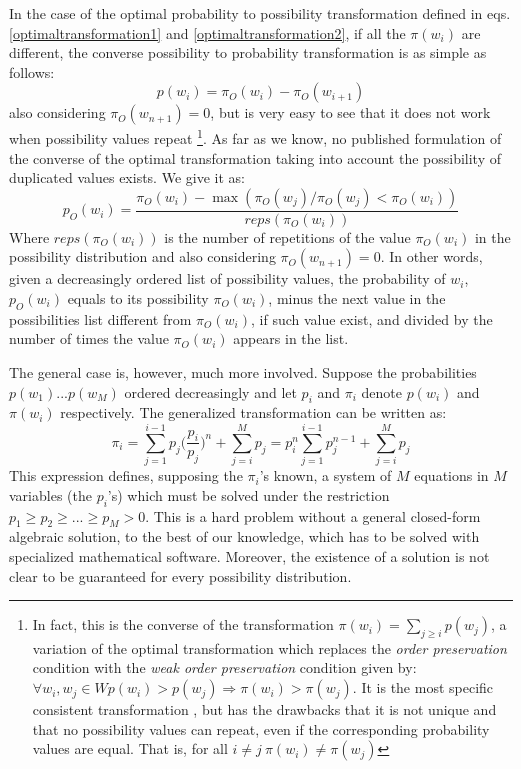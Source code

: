 \documentclass[a4paper]{article}
\begin{document}
In the case of the optimal probability to possibility transformation defined in eqs. \ref{optimaltransformation1} and \ref{optimaltransformation2}, if all the $\pi(w_i)$ are different, the converse possibility to probability transformation is as simple as follows:
\begin{equation}
p(w_i)=\pi_O(w_i)-\pi_O(w_{i+1})
\end{equation}
also considering $\pi_O(w_{n+1})=0$, but is very easy to see that it does not work when possibility values repeat \footnote{In fact, this is the converse of the transformation $\pi(w_i)=\sum_{j \geq i}p(w_j)$, a variation of the optimal transformation which replaces the \textit{order preservation} condition with the \textit{weak order preservation} condition given by: $\forall w_i,w_j \in W  p(w_i) > p(w_j) \Rightarrow \pi(w_i) > \pi(w_j)$. It is the most specific consistent transformation \cite{Delgado87}, but has the drawbacks that it is not unique and that no possibility values can repeat, even if the corresponding probability values are equal. That is, for all $i \neq j \ \pi(w_i) \neq \pi(w_j)$ }. 
As far as we know, no published formulation of the converse of the optimal transformation taking into account the possibility of duplicated values exists. We give it as:
\begin{equation}
p_O(w_i)=\frac{\pi_O(w_i)-\max (\pi_O(w_j)/\pi_O(w_j)<\pi_O(w_i))}{reps(\pi_O(w_i))}
\end{equation}
Where $reps(\pi_O(w_i))$ is the number of repetitions of the value $\pi_O(w_i)$ in the possibility distribution and also considering $\pi_O(w_{n+1})=0$. In other words, given a decreasingly ordered list of possibility values, the probability of $w_i$, $p_O(w_i)$ equals to its possibility $\pi_O(w_i)$, minus the next value in the possibilities list different from $\pi_O(w_i)$, if such value exist, and divided by the number of times the value $\pi_O(w_i)$ appears in the list.

The general case is, however, much more involved. Suppose the probabilities $p(w_1) ... p(w_M)$ ordered decreasingly and let $p_i$ and $\pi_i$ denote $p(w_i)$ and $\pi(w_i)$ respectively. The generalized transformation can be written as:
\begin{equation}
\pi_i=\sum_{j=1}^{i-1}p_j \Big(\frac{p_i}{p_j}\Big)^n + \sum_{j=i}^{M}p_j = p_i^{n}\sum_{j=1}^{i-1}p_j^{n-1}+ \sum_{j=i}^{M}p_j 
\end{equation}
This expression defines, supposing the $\pi_i$'s known, a system of $M$ equations in $M$ variables (the $p_i$'s) which must be solved under the restriction $p_1 \geq p_2 \geq ... \geq p_M > 0$. This is a hard problem without a general closed-form algebraic solution, to the best of our knowledge, which has to be solved with specialized mathematical software. Moreover, the existence of a solution is not clear to be guaranteed for every possibility distribution. 
\end{document}
